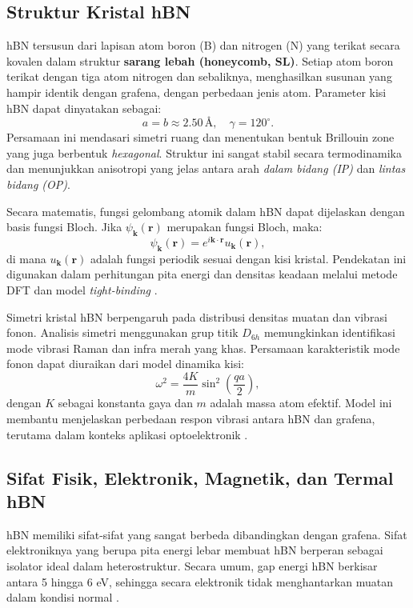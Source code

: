 \subsection{Struktur Kristal hBN}
hBN tersusun dari lapisan atom boron (B) dan nitrogen (N) yang terikat secara kovalen dalam struktur \textbf{sarang lebah (honeycomb, SL)}. Setiap atom boron terikat dengan tiga atom nitrogen dan sebaliknya, menghasilkan susunan yang hampir identik dengan grafena, dengan perbedaan jenis atom. Parameter kisi hBN dapat dinyatakan sebagai:
\[
a = b \approx 2.50 \, \text{\AA}, \quad \gamma = 120^\circ.
\]
Persamaan ini mendasari simetri ruang dan menentukan bentuk Brillouin zone yang juga berbentuk \emph{hexagonal}. Struktur ini sangat stabil secara termodinamika dan menunjukkan anisotropi yang jelas antara arah \emph{dalam bidang (IP)} dan \emph{lintas bidang (OP)}.
  
Secara matematis, fungsi gelombang atomik dalam hBN dapat dijelaskan dengan basis fungsi Bloch. Jika \(\psi_{\mathbf{k}}(\mathbf{r})\) merupakan fungsi Bloch, maka:
\begin{equation}
    \psi_{\mathbf{k}}(\mathbf{r}) = e^{i\mathbf{k}\cdot\mathbf{r}} u_{\mathbf{k}}(\mathbf{r}),
\end{equation}
di mana \(u_{\mathbf{k}}(\mathbf{r})\) adalah fungsi periodik sesuai dengan kisi kristal. Pendekatan ini digunakan dalam perhitungan pita energi dan densitas keadaan melalui metode DFT dan model \emph{tight-binding} \citep{castro_neto_electronic_2009}.
  
Simetri kristal hBN berpengaruh pada distribusi densitas muatan dan vibrasi fonon. Analisis simetri menggunakan grup titik \(D_{6h}\) memungkinkan identifikasi mode vibrasi Raman dan infra merah yang khas. Persamaan karakteristik mode fonon dapat diuraikan dari model dinamika kisi:
\begin{equation}
    \omega^2 = \frac{4K}{m}\sin^2\left(\frac{qa}{2}\right),
\end{equation}
dengan \(K\) sebagai konstanta gaya dan \(m\) adalah massa atom efektif. Model ini membantu menjelaskan perbedaan respon vibrasi antara hBN dan grafena, terutama dalam konteks aplikasi optoelektronik \citep{zhang_electrical_2016}.

\subsection{Sifat Fisik, Elektronik, Magnetik, dan Termal hBN}
hBN memiliki sifat-sifat yang sangat berbeda dibandingkan dengan grafena. Sifat elektroniknya yang berupa pita energi lebar membuat hBN berperan sebagai isolator ideal dalam heterostruktur. Secara umum, gap energi hBN berkisar antara 5 hingga 6 eV, sehingga secara elektronik tidak menghantarkan muatan dalam kondisi normal \citep{garcia_defect_2015}.
  
